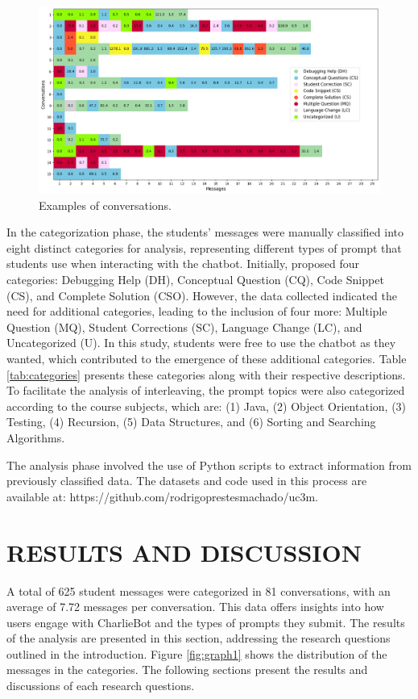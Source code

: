 \documentclass[a4paper,twoside]{article}
\begin{document}
\begin{figure}[htbp]
  \centering
  \includegraphics[scale=0.45]{img/figure2.png}
  \caption{Examples of conversations.}
  \label{fig:graph2}
\end{figure}

In the categorization phase, the students' messages were manually classified
into eight distinct categories for analysis, representing different types of
prompt that students use when interacting with the chatbot. Initially,
\cite{Ghimire24} proposed four categories: Debugging Help (DH), Conceptual
Question (CQ), Code Snippet (CS), and Complete Solution (CSO). However, the data
collected indicated the need for additional categories, leading to the inclusion
of four more: Multiple Question (MQ), Student Corrections (SC), Language Change
(LC), and Uncategorized (U). In this study, students were free to use the
chatbot as they wanted, which contributed to the emergence of these additional
categories. Table \ref{tab:categories} presents these categories along with
their respective descriptions. To facilitate the analysis of interleaving, the
prompt topics were also categorized according to the course subjects, which are:
(1) Java, (2) Object Orientation, (3) Testing, (4) Recursion, (5) Data
Structures, and (6) Sorting and Searching Algorithms.

The analysis phase involved the use of Python scripts to extract information
from previously classified data. The datasets and code used in this process are
available at: https://github.com/rodrigoprestesmachado/uc3m.

\section{\uppercase{Results and Discussion}}

A total of 625 student messages were categorized in 81 conversations, with
an average of 7.72 messages per conversation. This data offers insights into how
users engage with CharlieBot and the types of prompts they submit. The results
of the analysis are presented in this section, addressing the research questions
outlined in the introduction. Figure \ref{fig:graph1} shows the distribution of
the messages in the categories. The following sections present the results and
discussions of each research questions.
\end{document}
